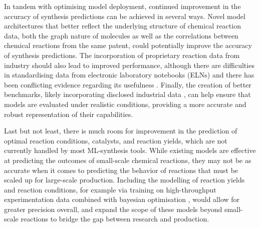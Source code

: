 In tandem with optimising model deployment, continued improvement in the accuracy of synthesis predictions can be achieved in several ways. Novel model architectures that better reflect the underlying structure of chemical reaction data, both the graph nature of molecules as well as the correlations between chemical reactions from the same patent, could potentially improve the accuracy of synthesis predictions. The incorporation of proprietary reaction data from industry should also lead to improved performance, although there are difficulties in standardising data from electronic laboratory notebooks (ELNs) \cite{Jablonka2022OpenChemistry} and there has been conflicting evidence regarding its usefulness \cite{Thakkar2020DatasetsSynthesis, Wiest2023DatasetYields}. Finally, the creation of better benchmarks, likely incorporating disclosed industrial data \cite{Kearnes2021OpenReaction}, can help ensure that models are evaluated under realistic conditions, providing a more accurate and robust representation of their capabilities.

Last but not least, there is much room for improvement in the prediction of optimal reaction conditions, catalysts, and reaction yields, \cite{Ahneman2018PredictingCoupling, Schwaller2021YieldPrediction, Probst2022ReactionClassification} which are not currently handled by most ML-synthesis tools. While existing models are effective at predicting the outcomes of small-scale chemical reactions, they may not be as accurate when it comes to predicting the behavior of reactions that must be scaled up for large-scale production. Including the modelling of reaction yields and reaction conditions, for example via training on high-throughput experimentation data \cite{king2022probing, xu2022roadmap} combined with bayesian optimisation \cite{Shields2021BayesOptReaction}, would allow for greater precision overall, and expand the scope of these models beyond small-scale reactions to bridge the gap between research and production.

